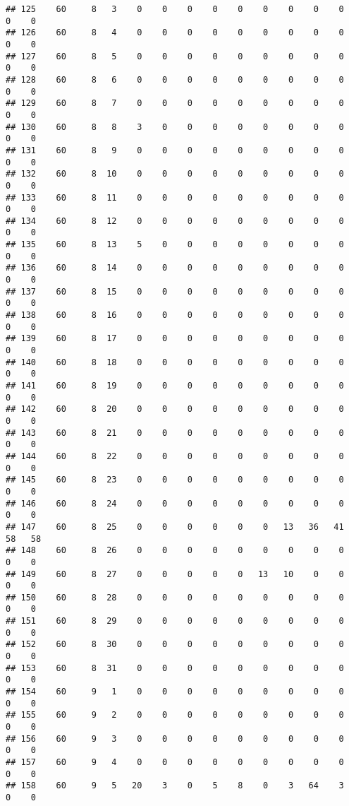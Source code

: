 \documentclass[]{article}
\begin{document}
\begin{verbatim}
## 125    60     8   3    0    0    0    0    0    0    0    0    0    0    0
## 126    60     8   4    0    0    0    0    0    0    0    0    0    0    0
## 127    60     8   5    0    0    0    0    0    0    0    0    0    0    0
## 128    60     8   6    0    0    0    0    0    0    0    0    0    0    0
## 129    60     8   7    0    0    0    0    0    0    0    0    0    0    0
## 130    60     8   8    3    0    0    0    0    0    0    0    0    0    0
## 131    60     8   9    0    0    0    0    0    0    0    0    0    0    0
## 132    60     8  10    0    0    0    0    0    0    0    0    0    0    0
## 133    60     8  11    0    0    0    0    0    0    0    0    0    0    0
## 134    60     8  12    0    0    0    0    0    0    0    0    0    0    0
## 135    60     8  13    5    0    0    0    0    0    0    0    0    0    0
## 136    60     8  14    0    0    0    0    0    0    0    0    0    0    0
## 137    60     8  15    0    0    0    0    0    0    0    0    0    0    0
## 138    60     8  16    0    0    0    0    0    0    0    0    0    0    0
## 139    60     8  17    0    0    0    0    0    0    0    0    0    0    0
## 140    60     8  18    0    0    0    0    0    0    0    0    0    0    0
## 141    60     8  19    0    0    0    0    0    0    0    0    0    0    0
## 142    60     8  20    0    0    0    0    0    0    0    0    0    0    0
## 143    60     8  21    0    0    0    0    0    0    0    0    0    0    0
## 144    60     8  22    0    0    0    0    0    0    0    0    0    0    0
## 145    60     8  23    0    0    0    0    0    0    0    0    0    0    0
## 146    60     8  24    0    0    0    0    0    0    0    0    0    0    0
## 147    60     8  25    0    0    0    0    0    0   13   36   41   58   58
## 148    60     8  26    0    0    0    0    0    0    0    0    0    0    0
## 149    60     8  27    0    0    0    0    0   13   10    0    0    0    0
## 150    60     8  28    0    0    0    0    0    0    0    0    0    0    0
## 151    60     8  29    0    0    0    0    0    0    0    0    0    0    0
## 152    60     8  30    0    0    0    0    0    0    0    0    0    0    0
## 153    60     8  31    0    0    0    0    0    0    0    0    0    0    0
## 154    60     9   1    0    0    0    0    0    0    0    0    0    0    0
## 155    60     9   2    0    0    0    0    0    0    0    0    0    0    0
## 156    60     9   3    0    0    0    0    0    0    0    0    0    0    0
## 157    60     9   4    0    0    0    0    0    0    0    0    0    0    0
## 158    60     9   5   20    3    0    5    8    0    3   64    3    0    0

\end{verbatim}
\end{document}
